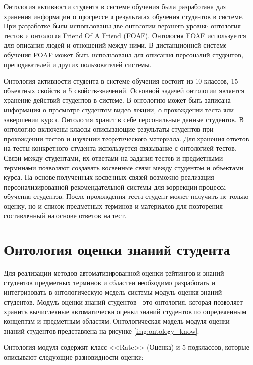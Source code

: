 Онтология активности студента в системе обучения была разработана для хранения информации о прогрессе и результатах обучения студентов в системе. При разработке были использованы две онтологии верхнего уровня: онтология тестов и онтология Friend Of A Friend (FOAF). Онтология FOAF используется для описания людей и отношений между ними. В дистанционной системе обучения FOAF может быть использована для описания персоналий студентов, преподавателей и других пользователей системы.

Онтология активности студента в системе обучения состоит из 10 классов, 15 объектных свойств и 5 свойств-значений. Основной задачей онтологии является хранение действий студентов в системе. В онтологию может быть записана информация о просмотре студентом видео-лекции, о прохождении теста или завершении курса. Онтология хранит в себе персональные данные студентов. В онтологию включены классы описывающие результаты студентов при прохождении тестов и изучении теоретического материала. Для хранения ответов на тесты конкретного студента используется связывание с онтологией тестов. Связи между студентами, их ответами на задания тестов и предметными терминами позволяют создавать косвенные связи между студентом и объектами курса. На основе полученных косвенных связей возможно реализация персонализированной рекомендательной системы для коррекции процесса обучения студентов. После прохождения теста студент может получить не только оценку, но и список предметных терминов и материалов для повторения составленный на основе ответов на тест.





\section{Онтология оценки знаний студента} \label{sect2_5}

Для реализации методов автоматизированной оценки рейтингов и знаний студентов предметных терминов и областей необходимо разработать и интегрировать в онтологическую модель системы модуль оценки знаний студентов. Модуль оценки знаний студентов - это онтология, которая позволяет хранить вычисленные автоматически оценки знаний студентов по определенным концептам и предметным областям. Онтологическая модель модуля оценки знаний студентов представлена на рисунке \ref{img:ontology_know}.

Онтология модуля содержит класс <<Rate>> (Оценка) и 5 подклассов, которые описывают следующие разновидности оценки:

